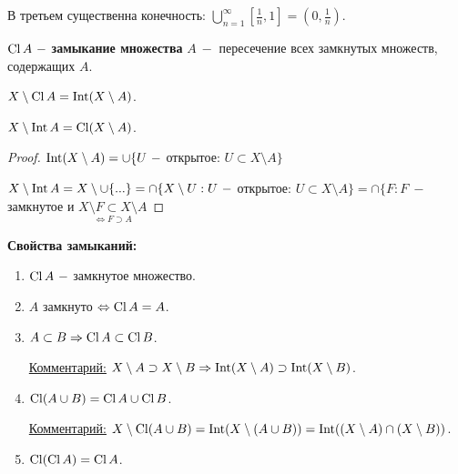 \begin{remark}
    В третьем существенна конечность: $\bigcup\limits_{n=1}^\infty[\frac{1}{n}, 1]=(0,\frac{1}{n})$.
\end{remark}

\begin{definition}
    $\operatorname{Cl} A\ -$ \textbf{замыкание множества} $A\ -$ пересечение всех замкнутых множеств, содержащих $A$.
\end{definition}

\begin{theorem}
    $X\setminus \operatorname{Cl} A=\operatorname{Int} (X\setminus A)$.

    $X\setminus \operatorname{Int} A=\operatorname{Cl} (X\setminus A)$.
\end{theorem}

\begin{proof}
    $\operatorname{Int}(X\setminus A)=\cup\{U\ - $ открытое: $U\subset X\setminus A \}$

    $X\setminus \operatorname{Int} A=X \setminus \cup \{...\}=\cap \{X\setminus U: U\ - $ открытое: $U\subset X\setminus A \}=\cap \{ F : F\ - $ замкнутое и $\underset{\Leftrightarrow F \supset A}{X\setminus F \subset X\setminus A}$
\end{proof}

\begin{statement}
    \textbf{Свойства замыканий:}
    \begin{enumerate}
        \item $\operatorname{Cl} A\ -$ замкнутое множество.
        \item $A$ замкнуто $\Leftrightarrow \operatorname{Cl} A=A$.
        \item $A\subset B\Rightarrow \operatorname{Cl} A\subset \operatorname{Cl} B$.

        \underline{Комментарий:} $X\setminus A \supset X\setminus B \Rightarrow \operatorname{Int} (X\setminus A)\supset \operatorname{Int} (X\setminus B)$.
        \item $\operatorname{Cl} (A\cup B)=\operatorname{Cl} A\cup \operatorname{Cl} B$.

        \underline{Комментарий:} $X\setminus \operatorname{Cl}(A\cup B)=\operatorname{Int} (X\setminus (A\cup B))=\operatorname{Int} ((X\setminus A)\cap (X\setminus B))$.

        \item $\operatorname{Cl} (\operatorname{Cl} A)=\operatorname{Cl} A$.
    \end{enumerate}
\end{statement}